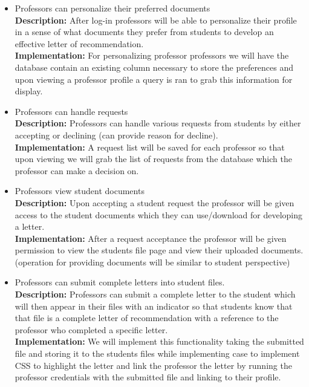 \documentclass[onecolumn, draftclsnofoot,10pt, compsoc]{IEEEtran}
\begin{document}
\begin{itemize}
		\item Professors can personalize their preferred documents\\
		\textbf{Description:} After log-in professors will be able to personalize their profile in a sense of what documents they prefer from students to develop an effective letter of recommendation.\\
		\textbf{Implementation:} For personalizing professor professors we will have the database contain an existing column necessary to store the preferences and upon viewing a professor profile a query is ran to grab this information for display.\\ 
		
		\item Professors can handle requests\\
		\textbf{Description:} Professors can handle various requests from students by either accepting or declining (can provide reason for decline).\\
		\textbf{Implementation:} A request list will be saved for each professor so that upon viewing we will grab the list of requests from the database which the professor can make a decision on.\\
		 
		 \item Professors view student documents\\
		\textbf{Description:} Upon accepting a student request the professor will be given access to the student documents which they can use/download for developing a letter.\\
		\textbf{Implementation:} After a request acceptance the professor will be given permission to view the students file page and view their uploaded documents.(operation for providing documents will be similar to student perspective)\\
		
		\item Professors can submit complete letters into student files.\\
		\textbf{Description:} Professors can submit a complete letter to the student which will then appear in their files with an indicator so that students know that that file is a complete letter of recommendation with a reference to the professor who completed a specific letter.\\
		\textbf{Implementation:} We will implement this functionality taking the submitted file and storing it to the students files while implementing case to implement CSS to highlight the letter and link the professor the letter by running the professor credentials with the submitted file and linking to their profile.\\
	\end{itemize}
\end{document}
